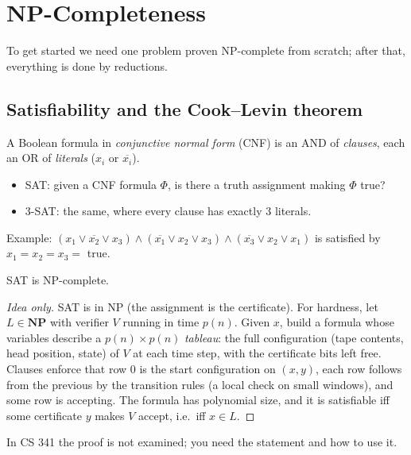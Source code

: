 \chapter{NP-Completeness}


To get started we need one problem proven NP-complete from scratch; after that, everything is done by reductions.

\section{Satisfiability and the Cook--Levin theorem}
A Boolean formula in \emph{conjunctive normal form} (CNF) is an AND of \emph{clauses}, each an OR of \emph{literals} ($x_i$ or $\overline{x_i}$).
\begin{itemize}
  \item \textsc{SAT}: given a CNF formula $\Phi$, is there a truth assignment making $\Phi$ true?
  \item \textsc{3-SAT}: the same, where every clause has exactly 3 literals.
\end{itemize}
Example: $(x_1\lor\overline{x_2}\lor x_3)\land(\overline{x_1}\lor x_2\lor x_3)\land(\overline{x_3}\lor x_2\lor x_1)$ is satisfied by $x_1=x_2=x_3=$ true.

\begin{theorem}
\textsc{SAT} is NP-complete.
\end{theorem}
\begin{proof}[Idea only]
SAT is in NP (the assignment is the certificate). For hardness, let $L\in\mathbf{NP}$ with verifier $V$ running in time $p(n)$. Given $x$, build a formula whose
variables describe a $p(n)\times p(n)$ \emph{tableau}: the full configuration (tape contents, head position, state) of $V$ at each time step, with the certificate
bits left free. Clauses enforce that row 0 is the start configuration on $(x,y)$, each row follows from the previous by the transition rules (a local check on
small windows), and some row is accepting. The formula has polynomial size, and it is satisfiable iff some certificate $y$ makes $V$ accept, i.e.\ iff $x\in L$.
\end{proof}
In CS 341 the proof is not examined; you need the statement and how to use it.

